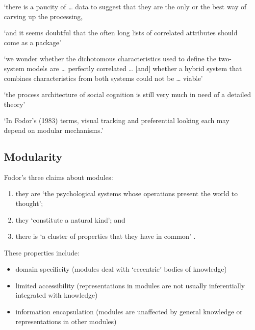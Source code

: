 \documentclass[12pt]{extarticle}
\begin{document}
\begin{multicols}{3}
‘there is a paucity of … data to suggest that they are the only or the best way of carving up the processing,
 
‘and it seems doubtful that the often long lists of correlated attributes should come as a package’
\citep[p.\ 759]{adolphs_conceptual_2010}
 
‘we wonder whether the dichotomous characteristics used to define the two-system models are … perfectly correlated …
[and] whether a hybrid system that combines characteristics from both systems could not be … viable’
\citep[p.\ 537]{keren_two_2009}
 
‘the process architecture of social cognition is still very much in need of a detailed theory’
\citep[p.\ 759]{adolphs_conceptual_2010}
 
‘In Fodor’s (1983) terms, visual tracking and preferential looking each may depend on modular mechanisms.’
\citep[p.\ 137]{spelke:1995_spatiotemporal}
 
\subsection{Modularity}
 
Fodor’s three claims about modules:
 
\begin{enumerate}
 
\item they are ‘the psychological systems whose operations present the world to thought’;
 
\item they ‘constitute a natural kind’; and
 
\item there is ‘a cluster of properties that they have in common’ \citep[p.\ 101]{Fodor:1983dg}.
 
\end{enumerate}
 
These properties include:
 
\begin{itemize}
 
\item domain specificity (modules deal with ‘eccentric’ bodies of knowledge)
 
\item limited accessibility (representations in modules are not usually inferentially integrated with knowledge)
 
\item information encapsulation (modules are unaffected by general knowledge or representations in other modules)
 

\end{itemize}
\end{multicols}
\end{document}
